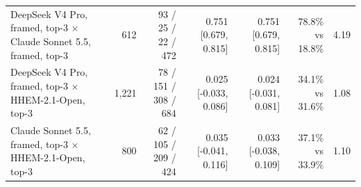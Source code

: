 \begin{tabular}{lrrrrrr}
DeepSeek V4 Pro, framed, top-3 $\times$ Claude Sonnet 5.5, framed, top-3 & 612 & 93 / 25 / 22 / 472 & 0.751 [0.679, 0.815] & 0.751 [0.679, 0.815] & 78.8\% vs 18.8\% & 4.19 \\
DeepSeek V4 Pro, framed, top-3 $\times$ HHEM-2.1-Open, top-3 & 1,221 & 78 / 151 / 308 / 684 & 0.025 [-0.033, 0.086] & 0.024 [-0.031, 0.081] & 34.1\% vs 31.6\% & 1.08 \\
Claude Sonnet 5.5, framed, top-3 $\times$ HHEM-2.1-Open, top-3 & 800 & 62 / 105 / 209 / 424 & 0.035 [-0.041, 0.116] & 0.033 [-0.038, 0.109] & 37.1\% vs 33.9\% & 1.10 \\
\bottomrule
\end{tabular}
